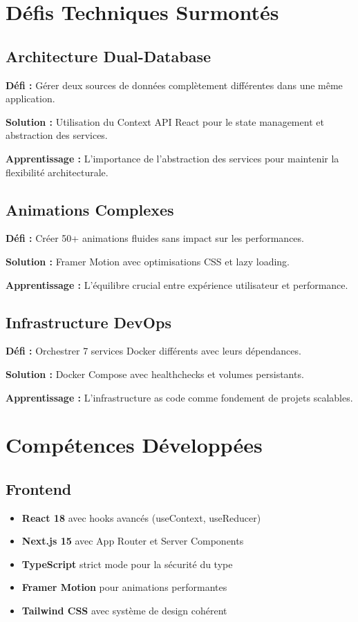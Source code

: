\documentclass[12pt,a4paper]{report}
\begin{document}
\section{Défis Techniques Surmontés}

\subsection{Architecture Dual-Database}
\textbf{Défi :} Gérer deux sources de données complètement différentes dans une même application.

\textbf{Solution :} Utilisation du Context API React pour le state management et abstraction des services.

\textbf{Apprentissage :} L'importance de l'abstraction des services pour maintenir la flexibilité architecturale.

\subsection{Animations Complexes}
\textbf{Défi :} Créer 50+ animations fluides sans impact sur les performances.

\textbf{Solution :} Framer Motion avec optimisations CSS et lazy loading.

\textbf{Apprentissage :} L'équilibre crucial entre expérience utilisateur et performance.

\subsection{Infrastructure DevOps}
\textbf{Défi :} Orchestrer 7 services Docker différents avec leurs dépendances.

\textbf{Solution :} Docker Compose avec healthchecks et volumes persistants.

\textbf{Apprentissage :} L'infrastructure as code comme fondement de projets scalables.

\section{Compétences Développées}

\subsection{Frontend}
\begin{itemize}
    \item \textbf{React 18} avec hooks avancés (useContext, useReducer)
    \item \textbf{Next.js 15} avec App Router et Server Components
    \item \textbf{TypeScript} strict mode pour la sécurité du type
    \item \textbf{Framer Motion} pour animations performantes
    \item \textbf{Tailwind CSS} avec système de design cohérent
\end{itemize}
\end{document}

